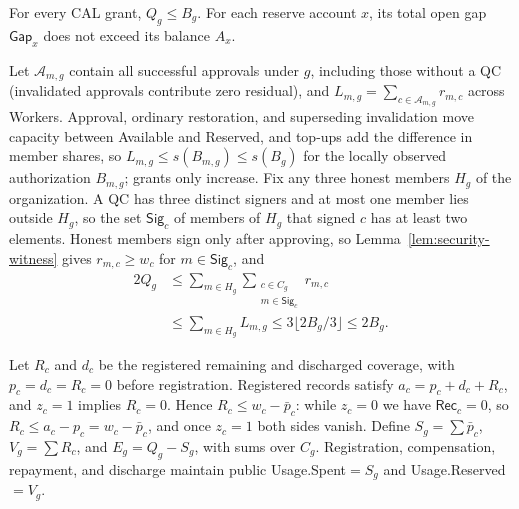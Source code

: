 \begin{theorem}
\label{thm:security-coverage}
For every CAL grant, $Q_g\le B_g$. For each reserve account $x$, its total
open gap $\mathsf{Gap}_x$ does not exceed its balance $A_x$.
\end{theorem}
\begin{IEEEproof}
Let $\mathcal A_{m,g}$ contain all successful approvals under $g$, including those without a QC (invalidated approvals contribute zero residual), and $L_{m,g}=\sum_{c\in\mathcal A_{m,g}}r_{m,c}$ across Workers. Approval, ordinary restoration, and superseding invalidation move capacity between Available and Reserved, and top-ups add the difference in member shares, so $L_{m,g}\le s(B_{m,g})\le s(B_g)$ for the locally observed authorization $B_{m,g}$; grants only increase. Fix any three honest members $H_g$ of the organization. A QC has three distinct signers and at most one member lies outside $H_g$, so the set $\mathsf{Sig}_c$ of members of $H_g$ that signed $c$ has at least two elements. Honest members sign only after approving, so Lemma~\ref{lem:security-witness} gives $r_{m,c}\ge w_c$ for $m\in\mathsf{Sig}_c$, and
\begin{equation}
\begin{aligned}
  2Q_g
  &\le\sum_{m\in H_g}\sum_{\substack{c\in C_g\\m\in\mathsf{Sig}_c}}r_{m,c}\\
  &\le\sum_{m\in H_g}L_{m,g}
  \le3\lfloor2B_g/3\rfloor\le2B_g.
\end{aligned}
\label{eq:security-counting}
\end{equation}

Let $R_c$ and $d_c$ be the registered remaining and discharged coverage, with $p_c=d_c=R_c=0$ before registration. Registered records satisfy $a_c=p_c+d_c+R_c$, and $z_c=1$ implies $R_c=0$. Hence $R_c\le w_c-\bar p_c$: while $z_c=0$ we have $\mathsf{Rec}_c=0$, so $R_c\le a_c-p_c=w_c-\bar p_c$, and once $z_c=1$ both sides vanish. Define $S_g=\sum\bar p_c$, $V_g=\sum R_c$, and $E_g=Q_g-S_g$, with sums over $C_g$. Registration, compensation, repayment, and discharge maintain public Usage.Spent$=S_g$ and Usage.Reserved$=V_g$.


\end{IEEEproof}
